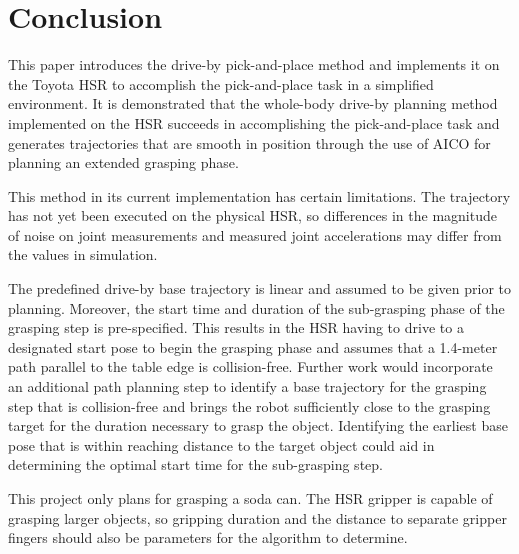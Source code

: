 \documentclass[12pt]{article}
\begin{document}

    \newpage     
    \section{Conclusion}
        This paper introduces the drive-by pick-and-place method and implements it on the Toyota HSR to accomplish the pick-and-place task in a simplified environment. It is demonstrated that the whole-body drive-by planning method implemented on the HSR succeeds in accomplishing the pick-and-place task and generates trajectories that are smooth in position through the use of AICO for planning an extended grasping phase.
        \par This method in its current implementation has certain limitations. The trajectory has not yet been executed on the physical HSR, so differences in the magnitude of noise on joint measurements and measured joint accelerations may differ from the values in simulation.

        \par The predefined drive-by base trajectory is linear and assumed to be given prior to planning. Moreover, the start time and duration of the sub-grasping phase of the grasping step is pre-specified. This results in the HSR having to drive to a designated start pose to begin the grasping phase and assumes that a 1.4-meter path parallel to the table edge is collision-free. Further work would incorporate an additional path planning step to identify a base trajectory for the grasping step that is collision-free and brings the robot sufficiently close to the grasping target for the duration necessary to grasp the object. Identifying the earliest base pose that is within reaching distance to the target object could aid in determining the optimal start time for the sub-grasping step.

        \par This project only plans for grasping a soda can. The HSR gripper is capable of grasping larger objects, so gripping duration and the distance to separate gripper fingers should also be parameters for the algorithm to determine.
\end{document}

